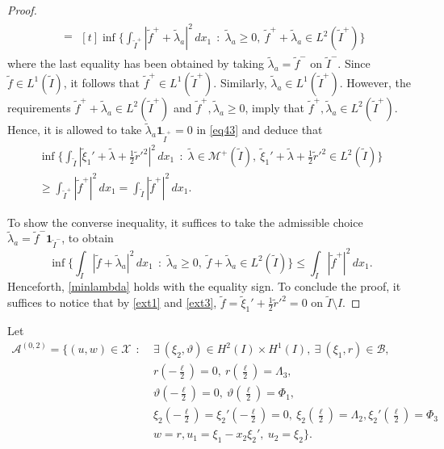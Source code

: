 \documentclass[a4, 11pt, reqno, final]{amsart}
\newcommand{\calA}{\mathcal{A}}
\newcommand{\calB}{\mathcal{B}}
\newcommand{\calM}{\mathcal{M}}
\newcommand{\calX}{\mathcal{X}}
\theoremstyle{plain}%
\newcommand{\QED}{\hspace{1ex}\hfill$\blacksquare$\vspace{2ex}}
\DeclareMathOperator{\st}{\,:\,}
\begin{document}
\begin{proof}
\begin{align}
			&= \begin{multlined}[t]
				\inf\{\int_{\widetilde{I}^+} |\widetilde{f}^+ + \widetilde{\lambda}_{a}|^2 \, dx_1  \st \widetilde{\lambda}_{a} \geq 0, \  \widetilde{f}^+  + \widetilde{\lambda}_{a} \in L^2(\widetilde{I}^+)\}
			\end{multlined}\label{eq43}
		\end{align}
		where the last equality has been obtained by taking $\widetilde{\lambda}_{a} = \widetilde{f}^-$ on $\widetilde{I}^-$.
		Since $\widetilde{f}\in L^1(\widetilde{I})$, it follows that $\widetilde{f}^+\in L^1(\widetilde{I}^+)$. Similarly, $\widetilde{\lambda}_a\in L^1(\widetilde{I}^+)$. However, the requirements $\widetilde{f}^+  + \widetilde{\lambda}_{a} \in L^2(\widetilde{I}^+)$ and $\widetilde{f}^+,\widetilde{\lambda}_a\ge 0$, imply that $\widetilde{f}^+, \widetilde{\lambda}_{a} \in L^2(\widetilde{I}^+)$.  Hence, it is allowed to take $\widetilde{\lambda}_a\mathbf{1}_{\widetilde{I}^+}=0$ in \eqref{eq43} and deduce that
		\begin{multline}
			\inf\{\int_{\widetilde{I}} |\widetilde{\xi}_1' + \widetilde{\lambda} + \frac12 \widetilde{r}'^2|^2 \, dx_1 \st  \widetilde{\lambda} \in \calM^+(\widetilde{I}), \ \widetilde{\xi}_1' + \widetilde{\lambda} + \frac12 \widetilde{r}'^2 \in L^2(\widetilde{I})\}\\
			\geq \int_{\widetilde{I}^+} |\widetilde{f}^+|^2 \, dx_1=\int_{\widetilde{I}} |\widetilde{f}^+|^2 \, dx_1.
		\end{multline}



		To show the converse inequality, it suffices to take the admissible choice $\widetilde{\lambda}_{a} = \widetilde{f}^-\mathbf{1}_{\widetilde{I}^-}$, to obtain
		\begin{equation}\label{minlambda}
			\inf\{\int_{\widetilde{I}} |\widetilde{f}  + \widetilde{\lambda}_{a}|^2 \, dx_1 \st \widetilde{\lambda}_{a} \geq 0, \  \widetilde{f}  + \widetilde{\lambda}_{a} \in L^2(\widetilde{I})\}  \leq \int_{\widetilde{I}} |\widetilde{f}^+|^2 \, dx_1.
		\end{equation}
		Henceforth, \eqref{minlambda} holds with the equality sign.
		To conclude the proof, it suffices to notice that by \eqref{ext1} and \eqref{ext3},  $\widetilde{f} = \widetilde{\xi}_1' + \frac12 \widetilde{r}'^2 = 0$ on $\widetilde{I}\setminus I$.
	\end{proof}
	Let $$ \begin{aligned} \calA^{(0,2)} =
		\{(u,w) \in \calX \st
		&\exists \  (\xi_2, \vartheta) \in H^2(I)\times H^1(I), \ \exists \ (\xi_1,r) \in \calB,\\
		&r(-\frac{\ell}{2}) = 0, \ r(\frac{\ell}{2}) = \Lambda_3,\\
		&\vartheta(-\frac{\ell}{2}) = 0, \ \vartheta(\frac{\ell}{2}) = \Phi_1,\\
		&\xi_2(-\frac{\ell}{2})=\xi_2'(-\frac{\ell}{2})=0, \ \xi_2(\frac{\ell}{2})=\Lambda_2, \xi_2'(\frac{\ell}{2})=\Phi_3\\
		&	w = r, u_1 = \xi_1 - x_2\xi_2', \ u_2 = \xi_2\}.
	\end{aligned}$$
\end{document}

